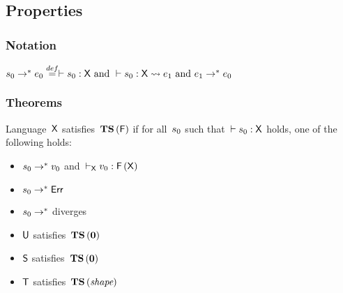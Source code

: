 \documentclass[nonacm,10pt]{acmart}
\begin{document}
\begin{mathpar}





\end{mathpar}


\subsection{Properties}

\subsubsection{Notation}

$\ssurface_0 \srr \sexpr_0
 \sdefeq
 \vdash \ssurface_0 : \stspec
  \mbox{ and } \vdash \ssurface_0 : \stspec \scompile \sexpr_1
  \mbox{ and } \sexpr_1 \srr \sexpr_0$


\subsubsection{Theorems}

\begin{theorem}[TS$(\sX,\stypemap)$]
  Language\ $\sX$
  satisfies\ $\fTS{\stypemap}$
  if for all\ $\ssurface_0$
  such that\ $\vdash \ssurface_0 : \stspec$
  holds, one of the following holds:
  \begin{itemize}
    \item $\ssurface_0 \srr \svalue_0$ and\ $\sWTX \svalue_0 : \ftypemap{\stspec}$
    \item $\ssurface_0 \srr \serror$
    \item $\ssurface_0 \srr$ diverges
  \end{itemize}
\end{theorem}

\begin{theorem}\leavevmode
  \begin{itemize}
    \item $\sU$ satisfies\ $\fTS{\stypemapzero}$
    \item $\sS$ satisfies\ $\fTS{\stypemapshape}$
    \item $\sT$ satisfies\ $\fTS{\stypemapone}$
  \end{itemize}
\end{theorem}
\end{document}

